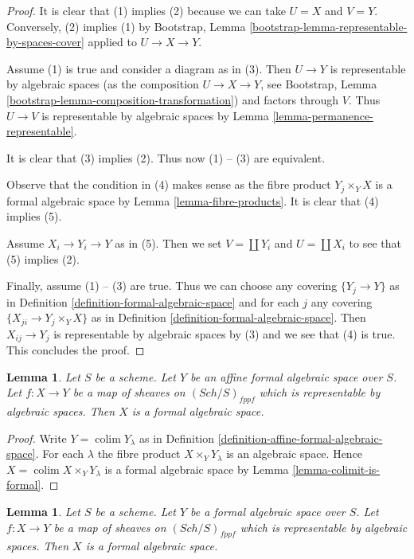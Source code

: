 \documentclass{stacks-project}
\theoremstyle{plain}
\newtheorem{lemma}[subsection]{Lemma}
\theoremstyle{definition}
\theoremstyle{remark}
\numberwithin{equation}{subsection}
\def\colim{\mathop{\mathrm{colim}}\nolimits}
\def\Sch{\mathit{Sch}}
\begin{document}
\begin{proof}
It is clear that (1) implies (2) because we can take $U = X$ and $V = Y$.
Conversely, (2) implies (1) by
Bootstrap, Lemma \ref{bootstrap-lemma-representable-by-spaces-cover}
applied to $U \to X \to Y$.

\medskip\noindent
Assume (1) is true and consider a diagram as in (3).
Then $U \to Y$ is representable by algebraic spaces
(as the composition $U \to X \to Y$, see
Bootstrap, Lemma \ref{bootstrap-lemma-composition-transformation})
and factors through $V$. Thus $U \to V$ is representable by
algebraic spaces by Lemma \ref{lemma-permanence-representable}.

\medskip\noindent
It is clear that (3) implies (2). Thus now (1) -- (3) are equivalent.

\medskip\noindent
Observe that the condition in (4) makes sense as the fibre product
$Y_j \times_Y X$ is a formal algebraic space by
Lemma \ref{lemma-fibre-products}.
It is clear that (4) implies (5).

\medskip\noindent
Assume $X_i \to Y_i \to Y$ as in (5). Then we set
$V = \coprod Y_i$ and $U = \coprod X_i$ to see that
(5) implies (2).

\medskip\noindent
Finally, assume (1) -- (3) are true.
Thus we can choose any covering $\{Y_j \to Y\}$ as in
Definition \ref{definition-formal-algebraic-space}
and for each $j$ any covering $\{X_{ji} \to Y_j \times_Y X\}$ as in
Definition \ref{definition-formal-algebraic-space}.
Then $X_{ij} \to Y_j$ is representable by algebraic spaces by (3)
and we see that (4) is true. This concludes the proof.
\end{proof}

\begin{lemma}
\label{lemma-algebraic-space-over-affine-formal}
Let $S$ be a scheme. Let $Y$ be an affine formal algebraic space over $S$.
Let $f : X \to Y$ be a map of sheaves on $(\Sch/S)_{fppf}$ which is
representable by algebraic spaces. Then $X$ is a formal
algebraic space.
\end{lemma}

\begin{proof}
Write $Y = \colim Y_\lambda$ as in
Definition \ref{definition-affine-formal-algebraic-space}.
For each $\lambda$ the fibre product
$X \times_Y Y_\lambda$ is an algebraic space.
Hence $X = \colim X \times_Y Y_\lambda$ is a formal
algebraic space by Lemma \ref{lemma-colimit-is-formal}.
\end{proof}

\begin{lemma}
\label{lemma-representable-by-algebraic-spaces}
Let $S$ be a scheme. Let $Y$ be a formal algebraic space over $S$.
Let $f : X \to Y$ be a map of sheaves on $(\Sch/S)_{fppf}$ which is
representable by algebraic spaces. Then $X$ is a formal
algebraic space.
\end{lemma}
\end{document}
